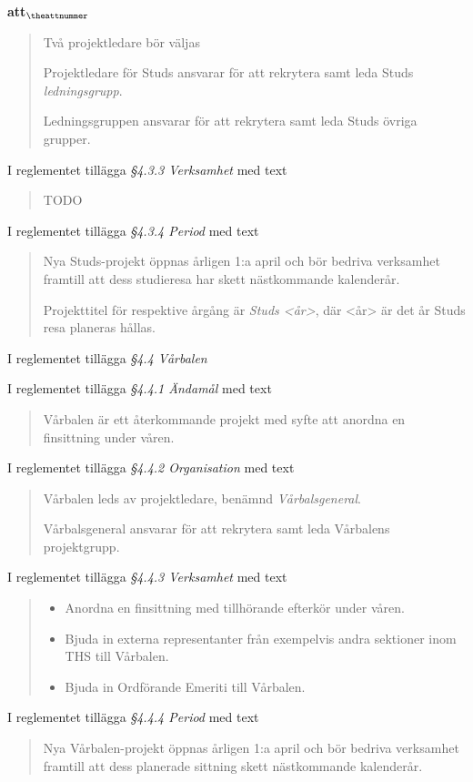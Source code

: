 \documentclass[a4paper]{article}
\begin{document}
\begin{list}{\bf att$_{\theattnummer}$}{}
\begin{quote}
        Två projektledare bör väljas

        Projektledare för Studs ansvarar för att rekrytera samt leda Studs \textit{ledningsgrupp}.

        Ledningsgruppen ansvarar för att rekrytera samt leda Studs övriga grupper.
    \end{quote}
\item I reglementet tillägga \textit{\S4.3.3 Verksamhet} med text
    \begin{quote}
        TODO
    \end{quote}
\item I reglementet tillägga \textit{\S4.3.4 Period} med text
    \begin{quote}
        Nya Studs-projekt öppnas årligen 1:a april och bör bedriva verksamhet framtill att dess studieresa har skett nästkommande kalenderår.

        Projekttitel för respektive årgång är \textit{Studs <år>}, där <år> är det år Studs resa planeras hållas.
    \end{quote}


\item I reglementet tillägga \textit{\S4.4 Vårbalen}
\item I reglementet tillägga \textit{\S4.4.1 Ändamål} med text
    \begin{quote}
        Vårbalen är ett återkommande projekt med syfte att anordna en finsittning under våren.
    \end{quote}
\item I reglementet tillägga \textit{\S4.4.2 Organisation} med text
    \begin{quote}
        Vårbalen leds av projektledare, benämnd \textit{Vårbalsgeneral}.

        Vårbalsgeneral ansvarar för att rekrytera samt leda Vårbalens projektgrupp.
    \end{quote}
\item I reglementet tillägga \textit{\S4.4.3 Verksamhet} med text
    \begin{quote}
        \begin{itemize}
            \item Anordna en finsittning med tillhörande efterkör under våren.
            \item Bjuda in externa representanter från exempelvis andra sektioner inom THS till Vårbalen.
            \item Bjuda in Ordförande Emeriti till Vårbalen.
        \end{itemize}
    \end{quote}
\item I reglementet tillägga \textit{\S4.4.4 Period} med text
    \begin{quote}
        Nya Vårbalen-projekt öppnas årligen 1:a april och bör bedriva verksamhet framtill att dess planerade sittning skett nästkommande kalenderår.


\end{quote}
\end{list}
\end{document}
